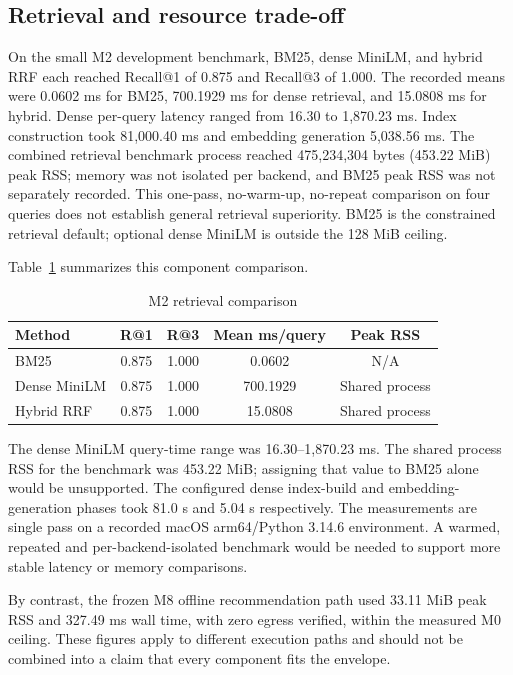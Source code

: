 \documentclass[conference]{IEEEtran}
\begin{document}
\subsection{Retrieval and resource trade-off}
On the small M2 development benchmark, BM25, dense MiniLM, and hybrid RRF each reached Recall@1 of 0.875 and Recall@3 of 1.000. The recorded means were 0.0602 ms for BM25, 700.1929 ms for dense retrieval, and 15.0808 ms for hybrid. Dense per-query latency ranged from 16.30 to 1,870.23 ms. Index construction took 81,000.40 ms and embedding generation 5,038.56 ms. The combined retrieval benchmark process reached 475,234,304 bytes (453.22 MiB) peak RSS; memory was not isolated per backend, and BM25 peak RSS was not separately recorded. This one-pass, no-warm-up, no-repeat comparison on four queries does not establish general retrieval superiority. BM25 is the constrained retrieval default; optional dense MiniLM is outside the 128 MiB ceiling.


Table~\ref{tab:m2} summarizes this component comparison.

\begin{table}[t]
\caption{M2 retrieval comparison}
\label{tab:m2}
\centering
\footnotesize
\begin{tabular}{lcccc}
\toprule
Method & R@1 & R@3 & Mean ms/query & Peak RSS\\
\midrule
BM25 & 0.875 & 1.000 & 0.0602 & N/A\\
Dense MiniLM & 0.875 & 1.000 & 700.1929 & Shared process\\
Hybrid RRF & 0.875 & 1.000 & 15.0808 & Shared process\\
\bottomrule
\end{tabular}
\end{table}

The dense MiniLM query-time range was 16.30--1,870.23 ms. The shared process RSS for the benchmark was 453.22 MiB; assigning that value to BM25 alone would be unsupported. The configured dense index-build and embedding-generation phases took 81.0 s and 5.04 s respectively. The measurements are single pass on a recorded macOS arm64/Python 3.14.6 environment. A warmed, repeated and per-backend-isolated benchmark would be needed to support more stable latency or memory comparisons.

By contrast, the frozen M8 offline recommendation path used 33.11 MiB peak RSS and 327.49 ms wall time, with zero egress verified, within the measured M0 ceiling. These figures apply to different execution paths and should not be combined into a claim that every component fits the envelope.
\end{document}
